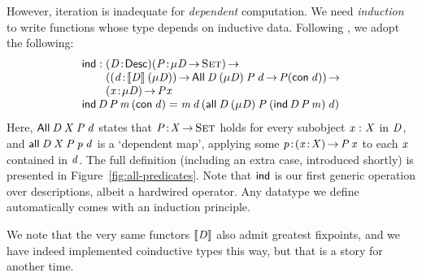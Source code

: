 However, iteration is inadequate for \emph{dependent} computation.
We need \emph{induction} to write functions whose type depends on inductive
data. Following \citet{benke:universe-generic-prog}, we adopt the following:
%
\[\stk{
\F{ind} : \stk{ \PITEL{\V{D}}{\Desc}
                    \PI{\V{P}}{\Mu{\V{D}} \To \Set}         \\
               (\PI{\V{d}}{\descop{\V{D}}{(\Mu{\V{D}})}}       
                \All{\V{D}}{(\Mu{\V{D}})}{\V{P}}{\V{d}} \To \V{P} (\Con{\V{d}})) \To \\
               \PI{\V{x}}{\Mu{\V{D}}} \V{P} \V{x} 
} \\
\F{ind}\, \V{D}\, \V{P}\, \V{m}\, (\Con{\V{d}}) = 
    \V{m}\, \V{d}\, (\all{\V{D}}{(\Mu{\V{D}})}{\V{P}}
                           {(\F{ind}\, \V{D}\, \V{P}\, \V{m})}
                           {\V{d}})
}\]
%
Here, $\All{\V{D}}{\V{X}}{\V{P}}{\V{d}}$ states that
$\Bhab{\V{P}}{\V{X} \To \Set}$ holds for every subobject $\V{x}:\V{X}$ in \(\V{D}\), and \(\all{\V{D}}{\V{X}}{\V{P}}{\V{p}}{\V{d}}\) is a
`dependent map', applying
some \(\Bhab{\V{p}}{\PIS{\Bhab{\x}{\V{X}}}\V{P}\,\V{x}}\) to each \(\x\)
contained in \(\V{d}\). The full
definition (including an extra case, introduced shortly) is presented in
Figure~\ref{fig:all-predicates}. Note that
\(\F{ind}\) is our first generic
operation over descriptions, albeit a hardwired operator.
Any datatype we define automatically
comes with an induction principle.

We note that the very same functors \(\SYMBdescop{\M{D}}\) also admit greatest
fixpoints, and we have indeed implemented coinductive types this way, but
that is a story for another time.

